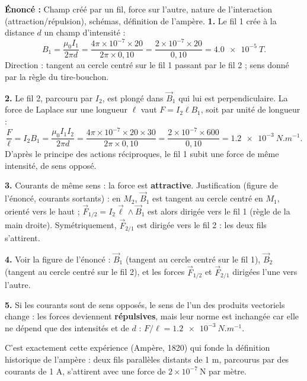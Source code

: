 \documentclass[11pt]{article}
\newcommand{\cle}[1]{{\popxbold\color{popdark}#1}}
\begin{document}
\begin{corrige}
\textbf{Énoncé :} Champ créé par un fil, force sur l'autre, nature de l'interaction (attraction/répulsion), schémas, définition de l'ampère.
\tcblower
\textbf{1.} Le fil 1 crée à la distance $d$ un champ d'intensité :
\[ B_1 = \frac{\mu_0 I_1}{2\pi d} = \frac{4\pi\times 10^{-7}\times 20}{2\pi \times 0{,}10} = \frac{2\times 10^{-7}\times 20}{0{,}10} = \SI{4,0e-5}{T}. \]
Direction : tangent au cercle centré sur le fil 1 passant par le fil 2 ; sens donné par la règle du tire-bouchon.

\textbf{2.} Le fil 2, parcouru par $I_2$, est plongé dans $\vec{B}_1$ qui lui est perpendiculaire. La force de Laplace sur une longueur $\ell$ vaut $F = I_2 \ell B_1$, soit par unité de longueur :
\[ \frac{F}{\ell} = I_2 B_1 = \frac{\mu_0 I_1 I_2}{2\pi d} = \frac{4\pi\times 10^{-7}\times 20\times 30}{2\pi\times 0{,}10} = \frac{2\times 10^{-7}\times 600}{0{,}10} = \SI{1,2e-3}{N.m^{-1}}. \]
D'après le principe des actions réciproques, le fil 1 subit une force de même intensité, de sens opposé.

\textbf{3.} Courants de \cle{même sens} : la force est \textbf{attractive}. Justification (figure de l'énoncé, courants sortants) : en $M_2$, $\vec{B}_1$ est tangent au cercle centré en $M_1$, orienté vers le haut ; $\vec{F}_{1/2} = I_2\vec{\ell}\wedge\vec{B}_1$ est alors dirigée vers le fil 1 (règle de la main droite). Symétriquement, $\vec{F}_{2/1}$ est dirigée vers le fil 2 : les deux fils s'attirent.

\textbf{4.} Voir la figure de l'énoncé : $\vec{B}_1$ (tangent au cercle centré sur le fil 1), $\vec{B}_2$ (tangent au cercle centré sur le fil 2), et les forces $\vec{F}_{1/2}$ et $\vec{F}_{2/1}$ dirigées l'une vers l'autre.

\textbf{5.} Si les courants sont de \cle{sens opposés}, le sens de l'un des produits vectoriels change : les forces deviennent \textbf{répulsives}, mais leur norme est inchangée car elle ne dépend que des intensités et de $d$ : $F/\ell = \SI{1,2e-3}{N.m^{-1}}$.
\begin{savaistu}
C'est exactement cette expérience (Ampère, 1820) qui fonde la \cle{définition historique de l'ampère} : deux fils parallèles distants de 1 m, parcourus par des courants de 1 A, s'attirent avec une force de $2\times 10^{-7}\ \mathrm{N}$ par mètre.
\end{savaistu}
\end{corrige}
\end{document}
